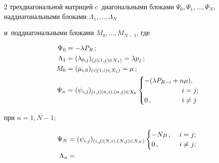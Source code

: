 \begin{multicols}{2}
трехдиагональной матрицей c~диагональными блоками $\Psi_0, \Psi_1, \ldots , 

\Psi_N$, наддиагональными блоками $\Lambda_1,\ldots, \Lambda_N$ 

и~поддиагональными блоками ${M}_0, \ldots , {M}_{N-1}$, где



\noindent

  \begin{align}

  \Psi_0 &= -\lambda P_R\,;\label{e2-v}\\

  \Lambda_1 &= (\lambda_{0,j})_{(j\vert(1,j)\in X_1)} = \lambda p_j\,; 

\label{e3-v}\\

  {M}_0 &= (\mu_{i,0})_{(i\vert (1,i)\in X_1)} = \mu\,;\label{e4-v}\\

  \Psi_n &= (\psi_{i,j})_{(i,j\vert(n,i),(n,j)\in X_k}

  \begin{cases} -(\lambda P_{R-i} +n\mu), &\\

  &\hspace*{-9mm}i=j;\\

  0\,, &\hspace*{-9mm}i\not=j

  \end{cases}\!\!

  \label{e5-v}

  \end{align}

при $n=\overline{1,N-1}$;

\pagebreak



\noindent

\begin{align}

\Psi_N&= (\psi_{i,j})_{(i,j\vert(N,i),(N,j)\in X_N)}\begin{cases}

-N\mu\,, &\ i=j;\\

0\,, &\ i\not=j;

\end{cases}

\label{e6-v}\\

\Lambda_n &= {}\notag\\


\end{align}
\end{multicols}

